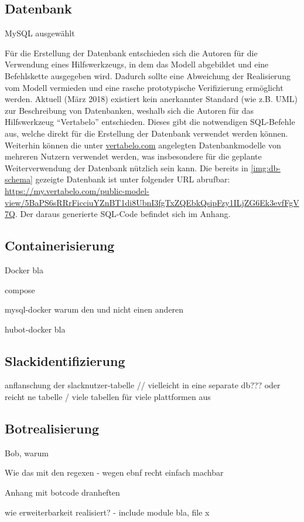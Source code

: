 \subsection{Datenbank}

MySQL ausgewählt

Für die Erstellung der Datenbank entschieden sich die Autoren für die Verwendung eines Hilfswerkzeugs, in dem das Modell abgebildet und eine Befehlskette ausgegeben wird. Dadurch sollte eine Abweichung der Realisierung vom Modell vermieden und eine rasche prototypische Verifizierung ermöglicht werden. Aktuell (März 2018) existiert kein anerkannter Standard (wie z.B. UML) zur Beschreibung von Datenbanken, weshalb sich die Autoren für das Hilfswerkzeug \enquote{Vertabelo} entschieden. Dieses gibt die notwendigen SQL-Befehle aus, welche direkt für die Erstellung der Datenbank verwendet werden können. Weiterhin können die unter \url{vertabelo.com} angelegten Datenbankmodelle von mehreren Nutzern verwendet werden, was insbesondere für die geplante Weiterverwendung der Datenbank nützlich sein kann.
Die bereits in \autoref{img:db-schema} gezeigte Datenbank ist unter folgender URL abrufbar: \url{https://my.vertabelo.com/public-model-view/5BaPS6sRRrFicciuYZnBT1di8UbnI3fgTxZQEbkQsipFzy1ILjZG6Ek3evfFgV7Q}. Der daraus generierte SQL-Code befindet sich im Anhang.





\subsection{Containerisierung}
Docker bla

compose

mysql-docker warum den und nicht einen anderen

hubot-docker bla



\subsection{Slackidentifizierung}

anflanschung der slacknutzer-tabelle // vielleicht in eine separate db??? oder reicht ne tabelle / viele tabellen für viele plattformen aus

\subsection{Botrealisierung}

Bob, warum

Wie das mit den regexen - wegen ebnf recht einfach machbar

Anhang mit botcode dranheften

wie erweiterbarkeit realisiert? - include module bla, file x
